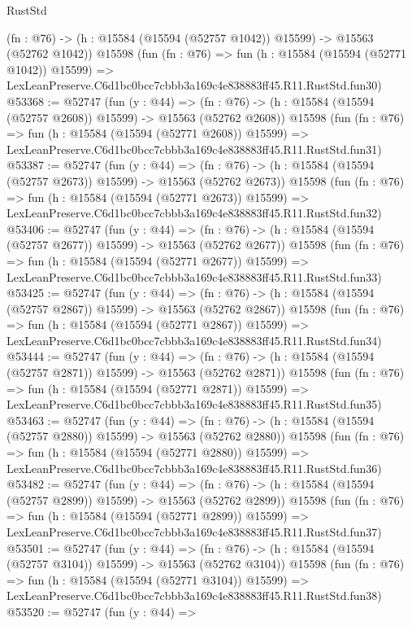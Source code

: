 \begin{lexlean}{RustStd}
\begin{coremodule}
    (fn : @76) -> (h : @15584 (@15594 (@52757 @1042)) @15599) -> @15563 (@52762 @1042))
    @15598
    (fun (fn : @76) =>
    fun (h : @15584 (@15594 (@52771 @1042)) @15599) =>
    LexLeanPreserve.C6d1bc0bcc7cbbb3a169c4e838883ff45.R11.RustStd.fun30)
@53368 := @52747
    (fun (y : @44) =>
    (fn : @76) -> (h : @15584 (@15594 (@52757 @2608)) @15599) -> @15563 (@52762 @2608))
    @15598
    (fun (fn : @76) =>
    fun (h : @15584 (@15594 (@52771 @2608)) @15599) =>
    LexLeanPreserve.C6d1bc0bcc7cbbb3a169c4e838883ff45.R11.RustStd.fun31)
@53387 := @52747
    (fun (y : @44) =>
    (fn : @76) -> (h : @15584 (@15594 (@52757 @2673)) @15599) -> @15563 (@52762 @2673))
    @15598
    (fun (fn : @76) =>
    fun (h : @15584 (@15594 (@52771 @2673)) @15599) =>
    LexLeanPreserve.C6d1bc0bcc7cbbb3a169c4e838883ff45.R11.RustStd.fun32)
@53406 := @52747
    (fun (y : @44) =>
    (fn : @76) -> (h : @15584 (@15594 (@52757 @2677)) @15599) -> @15563 (@52762 @2677))
    @15598
    (fun (fn : @76) =>
    fun (h : @15584 (@15594 (@52771 @2677)) @15599) =>
    LexLeanPreserve.C6d1bc0bcc7cbbb3a169c4e838883ff45.R11.RustStd.fun33)
@53425 := @52747
    (fun (y : @44) =>
    (fn : @76) -> (h : @15584 (@15594 (@52757 @2867)) @15599) -> @15563 (@52762 @2867))
    @15598
    (fun (fn : @76) =>
    fun (h : @15584 (@15594 (@52771 @2867)) @15599) =>
    LexLeanPreserve.C6d1bc0bcc7cbbb3a169c4e838883ff45.R11.RustStd.fun34)
@53444 := @52747
    (fun (y : @44) =>
    (fn : @76) -> (h : @15584 (@15594 (@52757 @2871)) @15599) -> @15563 (@52762 @2871))
    @15598
    (fun (fn : @76) =>
    fun (h : @15584 (@15594 (@52771 @2871)) @15599) =>
    LexLeanPreserve.C6d1bc0bcc7cbbb3a169c4e838883ff45.R11.RustStd.fun35)
@53463 := @52747
    (fun (y : @44) =>
    (fn : @76) -> (h : @15584 (@15594 (@52757 @2880)) @15599) -> @15563 (@52762 @2880))
    @15598
    (fun (fn : @76) =>
    fun (h : @15584 (@15594 (@52771 @2880)) @15599) =>
    LexLeanPreserve.C6d1bc0bcc7cbbb3a169c4e838883ff45.R11.RustStd.fun36)
@53482 := @52747
    (fun (y : @44) =>
    (fn : @76) -> (h : @15584 (@15594 (@52757 @2899)) @15599) -> @15563 (@52762 @2899))
    @15598
    (fun (fn : @76) =>
    fun (h : @15584 (@15594 (@52771 @2899)) @15599) =>
    LexLeanPreserve.C6d1bc0bcc7cbbb3a169c4e838883ff45.R11.RustStd.fun37)
@53501 := @52747
    (fun (y : @44) =>
    (fn : @76) -> (h : @15584 (@15594 (@52757 @3104)) @15599) -> @15563 (@52762 @3104))
    @15598
    (fun (fn : @76) =>
    fun (h : @15584 (@15594 (@52771 @3104)) @15599) =>
    LexLeanPreserve.C6d1bc0bcc7cbbb3a169c4e838883ff45.R11.RustStd.fun38)
@53520 := @52747
    (fun (y : @44) =>

\end{coremodule}
\end{lexlean}
